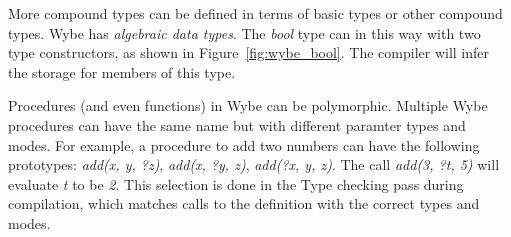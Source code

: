 More compound types can be defined in terms of basic types or other compound
types. Wybe has \textit{algebraic data types}. The \textit{bool} type can in
this way with two type constructors, as shown in
Figure~\ref{fig:wybe_bool}. The compiler will infer the storage for members of
this type. 


Procedures (and even functions) in Wybe can be polymorphic. Multiple Wybe
procedures can have the same name but with different paramter types and
modes. For example, a procedure to add two numbers can have the following
prototypes: \textit{add(x, y, ?z)}, \textit{add(x, ?y, z)}, \textit{add(?x, y,
  z)}. The call \textit{add(3, ?t, 5)} will evaluate \textit{t} to be
\textit{2}. This selection is done in the Type checking pass during
compilation, which matches calls to the definition with the correct types and
modes.


